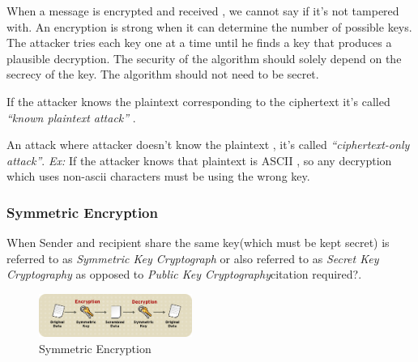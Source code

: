 \documentclass[a4paper]{article}
\begin{document}
When a message is encrypted and received , we cannot say if it's not tampered with. An encryption is strong when 
it can determine the number of possible keys. The attacker tries each key one at a time until he finds a key that 
produces a plausible decryption. The security of the algorithm should solely depend on the secrecy of the key. 
The algorithm should not need to be secret.

If the attacker knows the plaintext corresponding to the ciphertext it's called \textit{``known plaintext attack''} .

An attack where attacker doesn't know the plaintext , it's called \textit{``ciphertext-only attack''}.
\textit{Ex:} If the attacker knows that plaintext is ASCII , so any decryption which uses non-ascii characters must be using the wrong key.
\subsubsection{Symmetric Encryption}
When Sender and recipient share the same key(which must be kept secret) is referred to as \textit{Symmetric Key Cryptograph} or also
referred to as \textit{Secret Key Cryptography} as opposed to \textit{Public Key Cryptography}citation required?.
\begin{figure}[h]
    \centering
    \includegraphics[width=50mm]{symmetric.png}
    \caption{Symmetric Encryption}
\end{figure}
\end{document}
